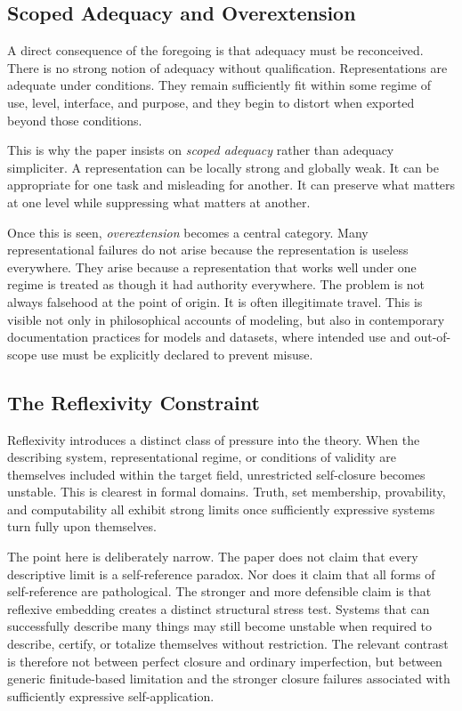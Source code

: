 \documentclass[11pt]{article}
\renewcommand{\emph}[1]{\textit{#1}}
\begin{document}
\subsection{Scoped Adequacy and Overextension}

A direct consequence of the foregoing is that adequacy must be reconceived. There is no strong notion of adequacy without qualification. Representations are adequate under conditions. They remain sufficiently fit within some regime of use, level, interface, and purpose, and they begin to distort when exported beyond those conditions.

This is why the paper insists on \emph{scoped adequacy} rather than adequacy simpliciter. A representation can be locally strong and globally weak. It can be appropriate for one task and misleading for another. It can preserve what matters at one level while suppressing what matters at another. \cite{frigg_nguyen_scientific_representation_sep,scientific_pluralism_sep}

Once this is seen, \emph{overextension} becomes a central category. Many representational failures do not arise because the representation is useless everywhere. They arise because a representation that works well under one regime is treated as though it had authority everywhere. The problem is not always falsehood at the point of origin. It is often illegitimate travel. This is visible not only in philosophical accounts of modeling, but also in contemporary documentation practices for models and datasets, where intended use and out-of-scope use must be explicitly declared to prevent misuse. \cite{mitchell_model_cards,gebru_datasheets,nist_explainable_ai}

\subsection{The Reflexivity Constraint}

Reflexivity introduces a distinct class of pressure into the theory. When the describing system, representational regime, or conditions of validity are themselves included within the target field, unrestricted self-closure becomes unstable. This is clearest in formal domains. Truth, set membership, provability, and computability all exhibit strong limits once sufficiently expressive systems turn fully upon themselves. \cite{bolander_self_reference_sep}

The point here is deliberately narrow. The paper does not claim that every descriptive limit is a self-reference paradox. Nor does it claim that all forms of self-reference are pathological. The stronger and more defensible claim is that reflexive embedding creates a distinct structural stress test. Systems that can successfully describe many things may still become unstable when required to describe, certify, or totalize themselves without restriction. The relevant contrast is therefore not between perfect closure and ordinary imperfection, but between generic finitude-based limitation and the stronger closure failures associated with sufficiently expressive self-application. \cite{bolander_self_reference_sep}
\end{document}
